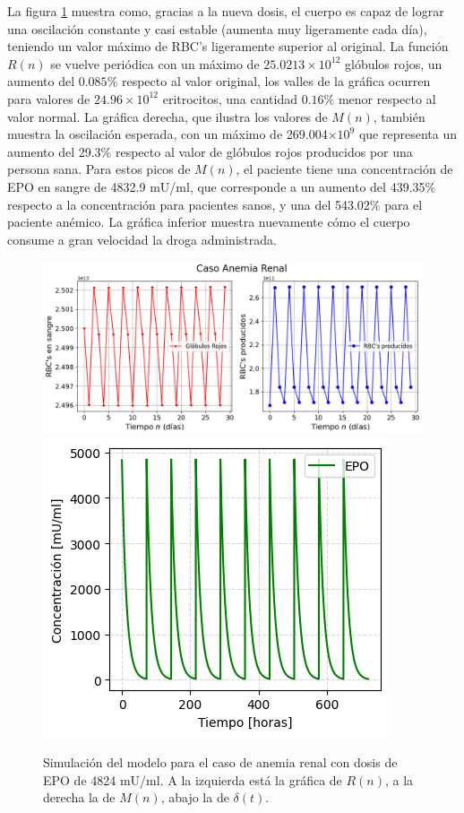 La figura \ref{sec:variaciones:fig:Anemia2} muestra como, gracias a la nueva dosis, el cuerpo es capaz de lograr una oscilación constante y casi estable (aumenta muy ligeramente cada día), teniendo un valor máximo de RBC's ligeramente superior al original. La función $R(n)$ se vuelve periódica con un máximo de $25.0213\times 10^{12}$ glóbulos rojos, un aumento del $0.085\%$ respecto al valor original, los valles de la gráfica ocurren para valores de $24.96\times 10^{12}$ eritrocitos, una cantidad $0.16\%$ menor respecto al valor normal. La gráfica derecha, que ilustra los valores de $M(n)$, también muestra la oscilación esperada, con un máximo de 269.004$\times 10^{9}$ que representa un aumento del 29.3$\%$ respecto al valor de glóbulos rojos producidos por una persona sana. Para estos picos de $M(n)$, el paciente tiene una concentración de EPO en sangre de 4832.9 mU/ml, que corresponde a un aumento del 439.35$\%$ respecto a la concentración para pacientes sanos, y una del 543.02$\%$ para el paciente anémico. La gráfica inferior muestra nuevamente cómo el cuerpo consume a gran velocidad la droga administrada. 

\begin{figure}[H]
    \centering
    \captionsetup{justification=centering}
    \includegraphics[scale=0.526]{figures/AR21.png}
    \includegraphics[scale=0.8]{figures/AR22.png}
    \caption{Simulación del modelo para el caso de anemia renal con dosis de EPO de 4824 mU/ml. A la izquierda está la gráfica de $R(n)$, a la derecha la de $M(n)$, abajo la de $\delta(t)$.}
    \label{sec:variaciones:fig:Anemia2}
\end{figure}

